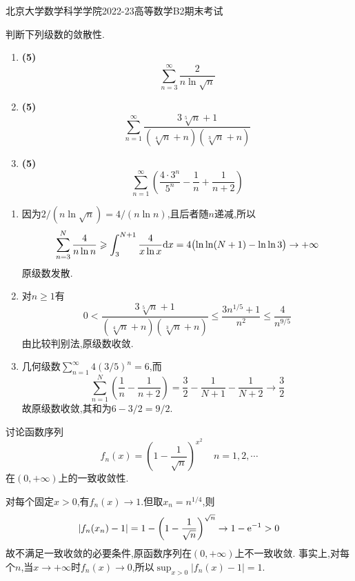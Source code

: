\documentclass{ctexart}
\begin{document}
\pagestyle{empty}
\begin{center}\Large
    北京大学数学科学学院2022-23高等数学B2期末考试
\end{center}
\begin{problem}[1.(15\songti{分})]
判断下列级数的敛散性.
        \begin{enumerate}[label=\tbf{(\arabic*)},topsep=0pt,parsep=0pt,itemsep=0pt,partopsep=0pt]
            \item \textbf{(5)}
                \[\sum_{n=3}^{\infty}\dfrac{2}{n\ln\sqrt{n}}\]
            \item \textbf{(5)}
                \[\sum_{n=1}^{\infty}\dfrac{3\sqrt[5]{n}+1}{\left(\sqrt[4]{n}+n\right)\left(\sqrt[3]{n}+n\right)}\]
            \item \textbf{(5)}
                \[\sum_{n=1}^{\infty}\left(\dfrac{4\cdot3^n}{5^n}-\dfrac{1}{n}+\dfrac{1}{n+2}\right)\]
        \end{enumerate}
\end{problem}
\begin{solution}
\begin{enumerate}[label=\tbf{(\arabic*)},topsep=0pt,parsep=0pt,itemsep=0pt,partopsep=0pt]
\item 因为$2/(n\ln\sqrt n)=4/(n\ln n)$,且后者随$n$递减,所以
\[\sum_{n=3}^N\frac4{n\ln n}\geqslant\int_3^{N+1}\frac4{x\ln x}\mathrm{d} x
=4\bigl(\ln\ln(N+1)-\ln\ln3\bigr)\to+\infty\]
原级数发散.
\item 对$n\geqslant1$有
\[0<\frac{3\sqrt[5]n+1}{(\sqrt[4]n+n)(\sqrt[3]n+n)}
\leqslant\frac{3n^{1/5}+1}{n^2}\leqslant\frac4{n^{9/5}}\]
由比较判别法,原级数收敛.
\item 几何级数$\sum_{n=1}^{\infty}4(3/5)^n=6$,而
\[\sum_{n=1}^N\left(\frac1n-\frac1{n+2}\right)
=\frac32-\frac1{N+1}-\frac1{N+2}\to\frac32\]
故原级数收敛,其和为$6-3/2=9/2$.
\end{enumerate}
\end{solution}

\begin{problem}[2.(10\songti{分})]
讨论函数序列
        \[f_n(x)=\left(1-\dfrac{1}{\sqrt{n}}\right)^{x^2}\ \ \ \ \ n=1,2,\cdots\]
        在$(0,+\infty)$上的一致收敛性.
\end{problem}
\begin{solution}
对每个固定$x>0$,有$f_n(x)\to1$.但取$x_n=n^{1/4}$,则
\[|f_n(x_n)-1|=1-\left(1-\frac1{\sqrt n}\right)^{\sqrt n}\to1-\mathrm{e}^{-1}>0\]
故不满足一致收敛的必要条件,原函数序列在$(0,+\infty)$上不一致收敛.
事实上,对每个$n$,当$x\to+\infty$时$f_n(x)\to0$,所以$\sup_{x>0}|f_n(x)-1|=1$.
\end{solution}
\end{document}
